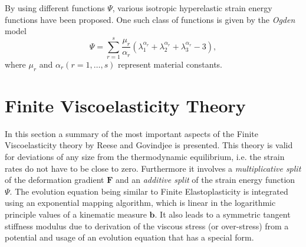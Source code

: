 By using different functions \(\Psi\), various isotropic hyperelastic strain energy functions have been proposed. One such class of functions is given by the \emph{Ogden} model 
\begin{equation}
    \Psi = \sum_{r = 1}^{s} \frac{\mu_{r}}{\alpha_{r}} (\lambda_{1}^{\alpha_{r}} + \lambda_{2}^{\alpha_{r}} + \lambda_{3}^{\alpha_{r}} - 3), 
\end{equation}
where \(\mu_{r}\) and \(\alpha_{r} (r =1,\ldots, s)\) represent material constants.

\section{Finite Viscoelasticity Theory}
\label{sec:finite_viscoelasticity}
In this section a summary of the most important aspects of the Finite Viscoelasticity theory by Reese and Govindjee \cite{Reese1998Sep} is presented. This theory is valid for deviations of any size from the thermodynamic equilibrium, i.e. the strain rates do not have to be close to zero. Furthermore it involves a \emph{multiplicative split} of the deformation gradient \(\mathbf{F}\) and an \emph{additive split} of the strain energy function \(\Psi\). The evolution equation being similar to Finite Elastoplasticity is integrated using an exponential mapping algorithm, which is linear in the logarithmic principle values of a kinematic measure \(\mathbf{b}\). It also leads to a symmetric tangent stiffness modulus due to derivation of the viscous stress (or over-stress) from a potential and usage of an evolution equation that has a special form.

